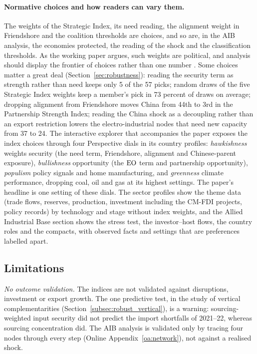 \paragraph{Normative choices and how readers can vary them.} The weights of the Strategic Index,
its need reading, the alignment weight in Friendshore and the coalition thresholds are choices, and so
are, in the AIB analysis, the economies protected, the reading of the shock and the classification
thresholds. As the working paper argues, such weights are political, and analysis should display the
frontier of choices rather than one number \citep{neis2026allied}. Some choices matter a great deal
(Section~\ref{sec:robustness}): reading the security term as strength rather than need keeps only 5 of
the 57 picks; random draws of the five Strategic Index weights keep a member's pick in 73 percent of
draws on average; dropping alignment from Friendshore moves China from 44th to 3rd in the Partnership
Strength Index; reading the China shock as a decoupling rather than an export restriction lowers the
electro-industrial nodes that need new capacity from 37 to 24. The interactive explorer that accompanies
the paper exposes the index choices through four Perspective dials in its country profiles:
\emph{hawkishness} weights security (the need term, Friendshore, alignment and Chinese-parent
exposure), \emph{bullishness} opportunity (the $\mathrm{EO}$ term and partnership opportunity),
\emph{populism} policy signals and home manufacturing, and \emph{greenness} climate performance,
dropping coal, oil and gas at its highest settings. The paper's headline is one setting of these dials.
The sector profiles show the theme data (trade flows, reserves, production, investment including the
CM-FDI projects, policy records) by technology and stage without index weights, and the Allied
Industrial Base section shows the stress test, the investor--host flows, the country roles and the
compacts, with observed facts and settings that are preferences labelled apart.

\subsection{Limitations}\label{subsec:discussion_limitations}

\emph{No outcome validation.} The indices are not validated against disruptions, investment or
export growth. The one predictive test, in the study of vertical complementarities
(Section~\ref{subsec:robust_vertical}), is a warning: sourcing-weighted input security did not
predict the import shortfalls of 2021--22, whereas sourcing concentration did. The AIB analysis is
validated only by tracing four nodes through every step (Online Appendix~\ref{oa:network}), not
against a realised shock.

